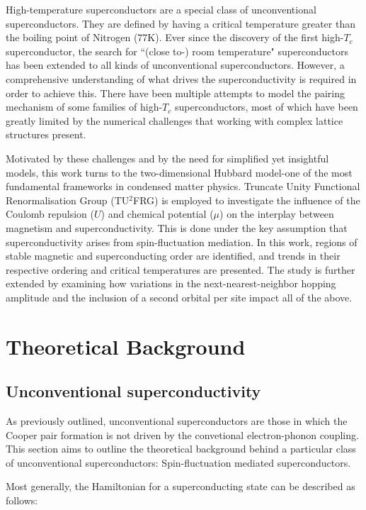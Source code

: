 \documentclass[12pt]{article}
\begin{document}
\medskip
\noindent High-temperature superconductors are a special class of unconventional superconductors. They are defined by having a critical temperature greater than the boiling point 
of Nitrogen (77K). Ever since the discovery of the first high-$T_c$ superconductor\cite{bednorz1986possible}, the search for ``(close to-) room temperature" superconductors has been extended to 
all kinds of unconventional superconductors. However, a comprehensive understanding of what drives the superconductivity is required in order 
to achieve this. There have been multiple attempts to model the pairing mechanism of some families of high-$T_c$ superconductors, most of which have
been greatly limited by the numerical challenges that working with complex lattice structures present.\par 

\medskip
\noindent Motivated by these challenges and by the need for simplified yet insightful models, this work turns to the two-dimensional Hubbard model-one of the most fundamental frameworks in condensed matter physics. Truncate Unity Functional Renormalisation Group (TU$^2$FRG)\cite{eckhardt2020truncated} is employed to 
investigate the influence of the Coulomb repulsion ($U$) and chemical potential ($\mu$) on the interplay between magnetism and superconductivity.
This is done under the key assumption that superconductivity arises from spin-fluctuation mediation.
In this work, regions of stable magnetic and superconducting order are identified, and trends in their respective ordering and critical temperatures are presented.
The study is further extended by examining how variations in the next-nearest-neighbor hopping amplitude and the inclusion of a second orbital per site impact all of the above.





\section{Theoretical Background}

\subsection{Unconventional superconductivity}

As previously outlined, unconventional superconductors are those in which the Cooper pair formation is not driven by the convetional electron-phonon coupling. 
This section aims to outline the theoretical background behind a particular class of unconventional superconductors: Spin-fluctuation mediated superconductors. \par
\medskip
\noindent Most generally, the Hamiltonian for a superconducting state can be described as follows:
\end{document}
